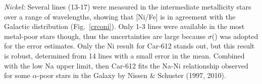 \documentclass{emulateapj}
\newcommand\etal{{\rm et al.\,}}
\begin{document}
{\it Nickel:} 
Several  lines (13-17) were measured in the intermediate
metallicity stars over a range of wavelengths, showing that [Ni/Fe]
 is in agreement with the Galactic distribution (Fig.~\ref{crconi}).   
Only 1-3  lines were available in the most metal-poor 
stars though, thus the uncertainties are large because $\sigma$() 
was adopted for the error estimates. 
Only the Ni result for Car-612 stands out, but this result is
robust, determined from 14  lines with a small error
in the mean.   Combined with the low Na upper limit, then Car-612
fits the Na-Ni relationship observed for some $\alpha$-poor stars
in the Galaxy by Nissen \& Schuster (1997, 2010).

% 
%
\end{document}
